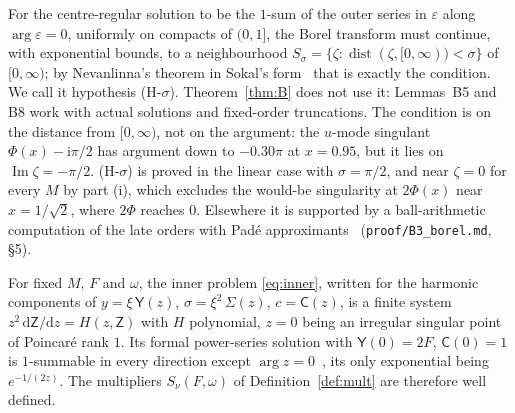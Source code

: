 \documentclass{amsart}
\numberwithin{equation}{section}
\theoremstyle{plain}
\newenvironment{lemnamed}[1]{\renewcommand\theinnerlem{#1}\innerlem}{\endinnerlem}
\theoremstyle{definition}
\theoremstyle{remark}
\newcommand{\eps}{\varepsilon}
\newcommand{\im}{\operatorname{Im}}
\newcommand{\iu}{\mathrm{i}}
\newcommand{\dd}{\mathrm{d}}
\newcommand{\repo}[1]{\texttt{#1}}
\begin{document}
For the centre-regular solution to be the $1$-sum of the outer series in $\eps$ along $\arg\eps = 0$, uniformly on compacts
of $(0, 1]$, the Borel transform must continue, with exponential bounds, to a neighbourhood
$S_\sigma = \{\zeta : \operatorname{dist}(\zeta, [0, \infty)) < \sigma\}$ of $[0, \infty)$; by Nevanlinna's theorem in Sokal's
form~\cite{Sokal1980} that is exactly the condition. We call it hypothesis (H-$\sigma$). Theorem~\ref{thm:B} does not use it:
Lemmas~B5 and B8 work with actual solutions and fixed-order truncations. The condition is on the distance from $[0, \infty)$,
not on the argument: the $u$-mode singulant $\Phi(x) - \iu\pi/2$ has argument down to $-0.30\pi$ at $x = 0.95$, but it lies on
$\im\zeta = -\pi/2$. (H-$\sigma$) is proved in the linear case with $\sigma = \pi/2$, and near $\zeta = 0$ for every $M$ by
part (i), which excludes the would-be singularity at $2\Phi(x)$ near $x = 1/\sqrt2$, where $2\Phi$ reaches $0$. Elsewhere it is
supported by a ball-arithmetic computation of the late orders with Pad\'e approximants~\cite{Pade1892} (\repo{proof/B3\_borel.md}, \S5).

\begin{lemnamed}{B4($M$)}\label{lem:B4}
For fixed $M$, $F$ and $\omega$, the inner problem \eqref{eq:inner}, written for the harmonic components of
$y = \xi\,\mathsf Y(z)$, $\sigma = \xi^2\,\mathsf\Sigma(z)$, $c = \mathsf C(z)$, is a finite system $z^2\,\dd\mathsf Z/\dd z = H(z, \mathsf Z)$ with $H$
polynomial, $z = 0$ being an irregular singular point of Poincar\'e rank $1$. Its formal power-series solution with
$\mathsf Y(0) = 2F$, $\mathsf C(0) = 1$ is $1$-summable in every direction except $\arg z = 0$~\cite{Braaksma1992}, its only
exponential being $e^{-1/(2z)}$. The multipliers $S_\nu(F, \omega)$ of Definition~\ref{def:mult} are therefore well defined.
\end{lemnamed}
\end{document}
